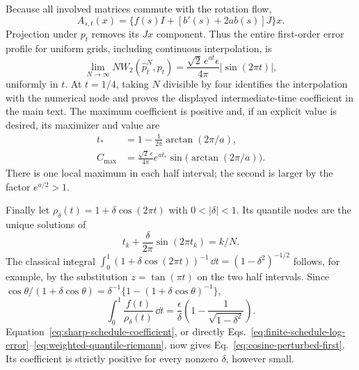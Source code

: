 Because all involved matrices commute with the rotation flow,
\[
 A_{s,t}(x)=\{f(s)I+[b'(s)+2ab(s)]J\}x.
\]
Projection under $p_t$ removes its $Jx$ component.  Thus the entire
first-order error profile for uniform grids, including continuous
interpolation, is
\begin{equation}
 \lim_{N\to\infty}N W_2(\widehat p_t^N,p_t)
 =\frac{\sqrt2\,e^{at}\epsilon}{4\pi}|\sin(2\pi t)|,
 \label{eq:cosine-uniform-first-profile}
\end{equation}
uniformly in $t$.  At $t=1/4$, taking $N$ divisible by four
identifies the interpolation with the numerical node and proves the
displayed intermediate-time coefficient in the main text.  The
maximum coefficient is positive and, if an explicit value is desired,
its maximizer and value are
\begin{align*}
 t_*&=1-\frac{1}{2\pi}\arctan(2\pi/a),\\
 C_{\max}&=\frac{\sqrt2\,\epsilon}{4\pi}
    e^{at_*}\sin\!\bigl(\arctan(2\pi/a)\bigr).
\end{align*}
There is one local maximum in each half interval; the second is
larger by the factor $e^{a/2}>1$.

Finally let $\rho_\delta(t)=1+\delta\cos(2\pi t)$ with
$0<|\delta|<1$.  Its quantile nodes are the unique solutions of
\[
 t_k+\frac{\delta}{2\pi}\sin(2\pi t_k)=k/N.
\]
The classical integral
$\int_0^1(1+\delta\cos(2\pi t))^{-1}\,\dd t
=(1-\delta^2)^{-1/2}$ follows, for example, by the substitution
$z=\tan(\pi t)$ on the two half intervals.  Since
$\cos\theta/(1+\delta\cos\theta)
=\delta^{-1}\{1-(1+\delta\cos\theta)^{-1}\}$,
\[
 \int_0^1\frac{f(t)}{\rho_\delta(t)}\,\dd t
 =\frac{\epsilon}{\delta}
          \left(1-\frac1{\sqrt{1-\delta^2}}\right).
\]
Equation~\eqref{eq:sharp-schedule-coefficient}, or directly
Eqs.~\eqref{eq:finite-schedule-log-error}--\eqref{eq:weighted-quantile-riemann},
now gives Eq.~\eqref{eq:cosine-perturbed-first}.  Its coefficient is
strictly positive for every nonzero $\delta$, however small.
